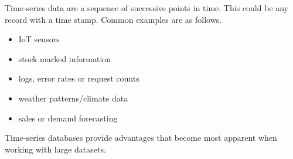 Time-series data are a sequence of successive points in time. This could be any
record with a time stamp. Common examples are as follows.

\begin{itemize}
  \item
        IoT sensors
  \item
        stock marked information
  \item
        logs, error rates or request counts
  \item
        weather patterns/climate data
  \item
        sales or demand forecasting
\end{itemize}

Time-series databases provide advantages that become most apparent when working
with large datasets.